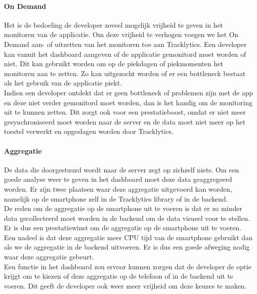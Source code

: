 \paragraph{On Demand}
Het is de bedoeling de developer zoveel mogelijk vrijheid te geven in het monitoren van de applicatie. Om deze vrijheid te verhogen voegen we het On Demand aan- of uitzetten van het monitoren toe aan Tracklytics. Een developer kan vanuit het dashboard aangeven of de applicatie gemonitord moet worden of niet. Dit kan gebruikt worden om op de piekdagen of piekmomenten het monitoren aan te zetten. Zo kan uitgezocht worden of er een bottleneck bestaat als het gebruik van de applicatie piekt. \\
Indien een developer ontdekt dat er geen bottleneck of problemen zijn met de app en deze niet verder gemonitord moet worden, dan is het handig om de monitoring uit te kunnen zetten. Dit zorgt ook voor een prestatieboost, omdat er niet meer gesynchroniseerd moet worden naar de server en de data moet niet meer op het toestel verwerkt en opgeslagen worden door Tracklytics.


\paragraph{Aggregatie}
De data die doorgestuurd wordt naar de server zegt op zichzelf niets. Om een goede analyse weer te geven in het dashboard moet deze data geaggregeerd worden. Er zijn twee plaatsen waar deze aggregatie uitgevoerd kan worden, namelijk op de smartphone zelf in de Tracklytics library of in de backend. \\
De reden om de aggregatie op de smartphone uit te voeren is dat er zo minder data gecollecteerd moet worden in de backend om de data visueel voor te stellen. Er is dus een prestatiewinst om de aggregatie op de smartphone uit te voeren. 
Een nadeel is dat deze aggregatie meer CPU tijd van de smartphone gebruikt dan als we de aggregatie in de backend uitvoeren. Er is dus een goede afweging nodig waar deze aggregatie gebeurt.\\

Een functie in het dashboard zou ervoor kunnen zorgen dat de developer de optie krijgt om te kiezen of deze aggregatie op de telefoon of in de backend uit te voeren. Dit geeft de developer ook weer meer vrijheid om deze keuzes te maken.

